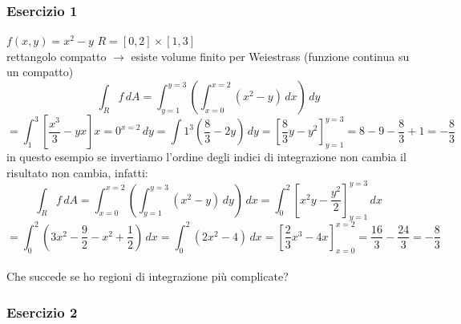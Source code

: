 \documentclass[10pt]{article}
\theoremstyle{plain}
\theoremstyle{definition}
\begin{document}
\subsubsection{Esercizio 1}
 $f(x,y)=x^2 - y$ \qquad $R = [0,2] \times [1,3]$ \\
rettangolo compatto $\longrightarrow$ esiste volume finito per Weiestrass (funzione continua su un compatto)\\
$$\int_R f \, dA = \int_{y=1}^{y=3} \left( \int_{x=0}^{x=2} (x^2 - y) \,dx \right) \,dy$$
$$= \int_{1}^{3} \left[ \frac{x^3}{3} - yx\right]{x=0}^{x=2} \,dy = \int{1}^{3} \left( \frac{8}{3} -2y \right) \,dy = \left[ \frac{8}{3} y - y^2\right]_{y=1}^{y=3} = 8 - 9 - \frac{8}{3} + 1 = -\frac{8}{3}$$
in questo esempio se invertiamo l'ordine degli indici di integrazione non cambia il risultato non cambia, infatti:
$$\int_R f \, dA = \int_{x=0}^{x=2} \left( \int_{y=1}^{y=3} (x^2 - y) \,dy \right) \,dx = \int_{0}^{2} \left[ x^2y - \frac{y^2}{2}\right]_{y=1}^{y=3} \,dx$$
$$= \int_{0}^{2} \left( 3x^2 - \frac{9}{2} - x^2 + \frac{1}{2} \right) \,dx = \int_{0}^{2} (2x^2 -4) \,dx = \left[ \frac{2}{3} x^3 - 4x \right]_{x=0}^{x=2} = \frac{16}{3} - \frac{24}{3} = -\frac{8}{3}$$
\\

Che succede se ho regioni di integrazione più complicate?
\\
\subsubsection{Esercizio 2}
\end{document}
